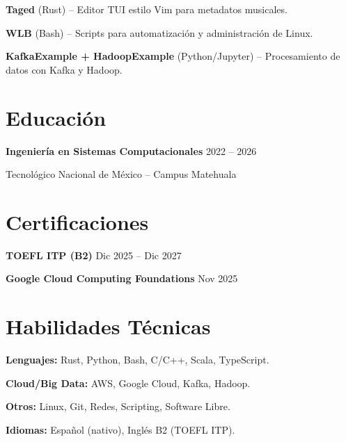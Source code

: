 \documentclass[10pt,letterpaper]{article}
\begin{document}
\noindent
\textbf{Taged} (Rust) -- Editor TUI estilo Vim para metadatos musicales.

\noindent
\textbf{WLB} (Bash) -- Scripts para automatización y administración de Linux.

\noindent
\textbf{KafkaExample + HadoopExample} (Python/Jupyter) -- Procesamiento de datos con Kafka y Hadoop.

\section{Educación}
\noindent
\textbf{Ingeniería en Sistemas Computacionales} \hfill 2022 -- 2026

\noindent
Tecnológico Nacional de México -- Campus Matehuala

\section{Certificaciones}
\noindent
\textbf{TOEFL ITP (B2)} \hfill Dic 2025 -- Dic 2027

\noindent
\textbf{Google Cloud Computing Foundations} \hfill Nov 2025

\section{Habilidades Técnicas}
\noindent
\textbf{Lenguajes:} Rust, Python, Bash, C/C++, Scala, TypeScript.

\noindent
\textbf{Cloud/Big Data:} AWS, Google Cloud, Kafka, Hadoop.

\noindent
\textbf{Otros:} Linux, Git, Redes, Scripting, Software Libre.

\noindent
\textbf{Idiomas:} Español (nativo), Inglés B2 (TOEFL ITP).
\end{document}
